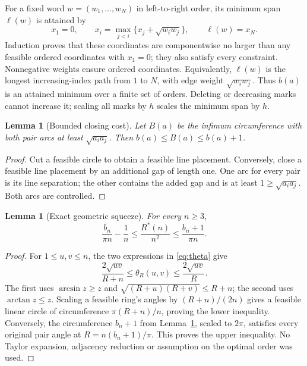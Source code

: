 \documentclass[11pt,letterpaper]{article}
\newtheorem{lemma}[theorem]{Lemma}
\theoremstyle{definition}\newtheorem{definition}[theorem]{Definition}
\theoremstyle{remark}\newtheorem{remark}[theorem]{Remark}
\newcommand{\Rstar}{R^\ast}
\DeclareMathOperator{\atan}{arctan}
\DeclareMathOperator{\asin}{arcsin}
\begin{document}
For a fixed word $w=(w_1,\ldots,w_N)$ in left-to-right order, its minimum
span $\ell(w)$ is attained by
\begin{equation}\label{eq:recurrence}
 x_1=0,\qquad x_i=\max_{j<i}\{x_j+\sqrt{w_iw_j}\},\qquad \ell(w)=x_N.
\end{equation}
Induction proves that these coordinates are componentwise no larger than
any feasible ordered coordinates with $x_1=0$; they also satisfy every
constraint. Nonnegative weights ensure ordered coordinates. Equivalently,
$\ell(w)$ is the longest increasing-index path from $1$ to $N$, with
edge weight $\sqrt{w_iw_j}$. Thus $b(a)$ is an attained minimum over a
finite set of orders. Deleting or decreasing marks cannot increase it;
scaling all marks by $h$ scales the minimum span by $h$.

\begin{lemma}[Bounded closing cost]\label{lem:closing}
Let $B(a)$ be the infimum circumference with both pair arcs at least
$\sqrt{a_i a_j}$. Then $b(a)\le B(a)\le b(a)+1$.
\end{lemma}
\begin{proof}
Cut a feasible circle to obtain a feasible line placement. Conversely,
close a feasible line placement by an additional gap of length one. One
arc for every pair is its line separation; the other contains the added
gap and is at least $1\ge\sqrt{a_i a_j}$. Both arcs are controlled.
\end{proof}

\begin{lemma}[Exact geometric squeeze]\label{lem:squeeze}
For every $n\ge3$,
\begin{equation}\label{eq:squeeze}
 \frac{b_n}{\pi n}-\frac1n
 \le\frac{\Rstar(n)}{n^2}\le\frac{b_n+1}{\pi n}.
\end{equation}
\end{lemma}
\begin{proof}
For $1\le u,v\le n$, the two expressions in \eqref{eq:theta} give
\[
 \frac{2\sqrt{uv}}{R+n}\le\theta_R(u,v)\le\frac{2\sqrt{uv}}R.
\]
The first uses $\asin z\ge z$ and
$\sqrt{(R+u)(R+v)}\le R+n$; the second uses $\atan z\le z$.
Scaling a feasible ring's angles by $(R+n)/(2n)$ gives a feasible linear
circle of circumference $\pi(R+n)/n$, proving the lower inequality.
Conversely, the circumference $b_n+1$ from Lemma~\ref{lem:closing},
scaled to $2\pi$, satisfies every original pair angle at
$R=n(b_n+1)/\pi$. This proves the upper inequality. No Taylor expansion,
adjacency reduction or assumption on the optimal order was used.
\end{proof}
\end{document}
